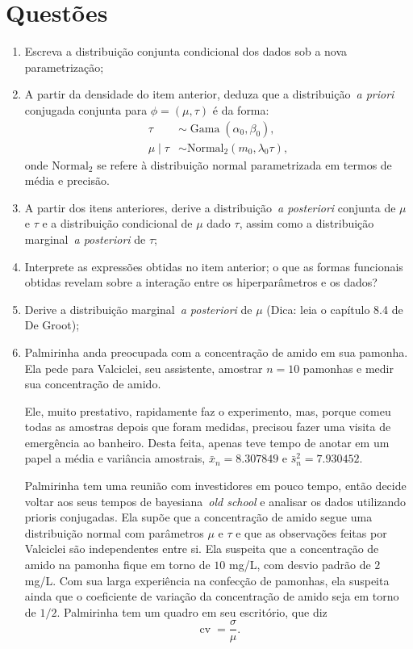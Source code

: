 \documentclass[a4paper,10pt, notitlepage]{report}
\begin{document}
\section*{Questões}
\begin{enumerate}
 \item Escreva a distribuição conjunta condicional dos dados sob a nova parametrização;
 \item A partir da densidade do item anterior, deduza que a distribuição~\textit{a priori} conjugada conjunta para $\phi = (\mu, \tau)$ é da forma:
 \begin{align}
  \tau &\sim \operatorname{Gama}(\alpha_0, \beta_0),\\
  \mu \mid \tau &\sim \operatorname{Normal_2}(m_0, \lambda_0\tau),
 \end{align}
onde $\operatorname{Normal_2}$ se refere à distribuição normal parametrizada em termos de média e precisão.
\item A partir dos itens anteriores, derive a distribuição~\textit{a posteriori} conjunta de $\mu$ e $\tau$ e a distribuição condicional de $\mu$ dado $\tau$, assim como a distribuição marginal~\textit{a posteriori} de $\tau$;
\item Interprete as expressões obtidas no item anterior; o que as formas funcionais obtidas revelam sobre a interação entre os hiperparâmetros e os dados?
\item Derive a distribuição marginal~\textit{a posteriori} de $\mu$ (Dica: leia o capítulo 8.4 de De Groot);
\item Palmirinha anda preocupada com a concentração de amido em sua pamonha.
Ela pede para Valciclei, seu assistente, amostrar $n=10$ pamonhas e medir sua concentração de amido.

Ele, muito prestativo, rapidamente faz o experimento, mas, porque comeu todas as amostras depois que foram medidas, precisou fazer uma visita de emergência ao banheiro. 
Desta feita, apenas teve tempo de anotar em um papel a média e variância amostrais, $\bar{x}_n =  8.307849$ e $\bar{s}^2_n = 7.930452$.

Palmirinha tem uma reunião com investidores em pouco tempo, então decide voltar aos seus tempos de bayesiana~\textit{old school} e analisar os dados utilizando prioris conjugadas.
Ela supõe que a concentração de amido segue uma distribuição normal com parâmetros $\mu$ e $\tau$ e que as observações feitas por Valciclei são independentes entre si.
Ela suspeita que a concentração de amido na pamonha fique em torno de $10$ mg/L, com desvio padrão de  $2$ mg/L.
Com sua larga experiência na confecção de pamonhas, ela suspeita ainda que o coeficiente de variação da concentração de amido seja em torno de $1/2$.
Palmirinha tem um quadro em seu escritório, que diz
\[ \operatorname{cv} = \frac{\sigma}{\mu}. \]


\end{enumerate}
\end{document}
